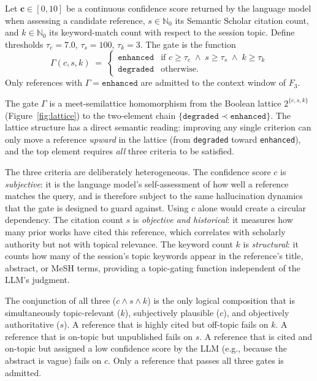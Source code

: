 \begin{definition}
\label{def:cgrag}
Let $\mathbf{c}\in[0,10]$ be a continuous confidence score returned by the language model
when assessing a candidate reference, $s\in\mathbb{N}_0$ its Semantic Scholar citation count,
and $k\in\mathbb{N}_0$ its keyword-match count with respect to the session topic.
Define thresholds $\tau_c=7.0$, $\tau_s=100$, $\tau_k=3$.
The \cgrag{} gate is the function
\[
  \Gamma(c,s,k) \;=\; \begin{cases}
    \texttt{enhanced} & \text{if } c\geq\tau_c \;\wedge\; s\geq\tau_s \;\wedge\; k\geq\tau_k \\
    \texttt{degraded} & \text{otherwise.}
  \end{cases}
\]
Only references with $\Gamma=\texttt{enhanced}$ are admitted to the context window of $F_3$.
\end{definition}

The gate $\Gamma$ is a meet-semilattice homomorphism from the Boolean lattice
$2^{\{c,s,k\}}$ (Figure~\ref{fig:lattice}) to the two-element chain
$\{\texttt{degraded}\prec\texttt{enhanced}\}$.
The lattice structure has a direct semantic reading: improving any single criterion
can only move a reference \emph{upward} in the lattice (from \texttt{degraded} toward
\texttt{enhanced}), and the top element requires \emph{all} three criteria to be satisfied.

The three criteria are deliberately heterogeneous.
The confidence score $c$ is \emph{subjective}: it is the language model's self-assessment
of how well a reference matches the query, and is therefore subject to the same
hallucination dynamics that the gate is designed to guard against.
Using $c$ alone would create a circular dependency.
The citation count $s$ is \emph{objective and historical}: it measures how many
prior works have cited this reference, which correlates with scholarly authority but
not with topical relevance.
The keyword count $k$ is \emph{structural}: it counts how many of the session's
topic keywords appear in the reference's title, abstract, or MeSH terms, providing
a topic-gating function independent of the LLM's judgment.

The conjunction of all three ($c\wedge s\wedge k$) is the only logical composition
that is simultaneously topic-relevant ($k$), subjectively plausible ($c$), and
objectively authoritative ($s$).
A reference that is highly cited but off-topic fails on $k$.
A reference that is on-topic but unpublished fails on $s$.
A reference that is cited and on-topic but assigned a low confidence score by the LLM
(e.g., because the abstract is vague) fails on $c$.
Only a reference that passes all three gates is admitted.

